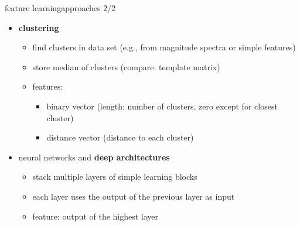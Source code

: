         \begin{frame}{feature learning}{approaches 2/2}
            \begin{itemize}
                \item   \textbf{clustering} 
                    \begin{itemize}
                        \item   find clusters in data set (e.g., from magnitude spectra or simple features)
                        \item   store median of clusters (compare: template matrix)
                        \smallskip
                        \item<2->[$\rightarrow$]   features:
                            \begin{itemize}
                                \item   binary vector (length: number of clusters, zero except for closest cluster)
                                \item   distance vector (distance to each cluster)
                            \end{itemize}
                    \end{itemize}
                \bigskip
                \item<3->   neural networks and \textbf{deep architectures} 
                    \begin{itemize}
                        \item   stack multiple layers of simple learning blocks
                        \item   each layer uses the output of the previous layer as input
                        \smallskip
                        \item<4->[$\rightarrow$]   feature: output of the highest layer
                    \end{itemize}
            \end{itemize}
		\end{frame}
